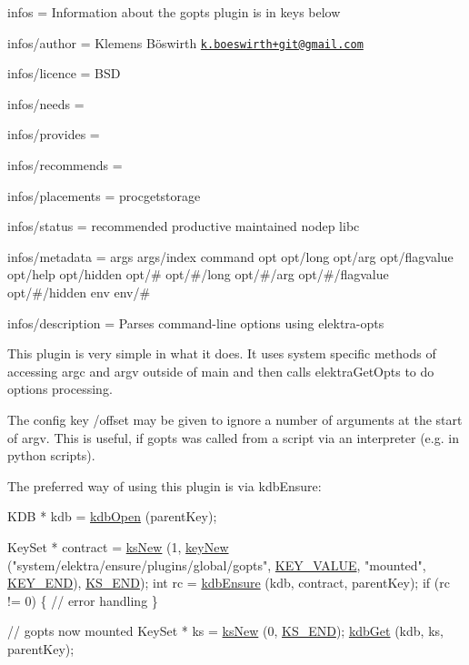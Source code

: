 
\begin{DoxyItemize}
\item infos = Information about the gopts plugin is in keys below
\item infos/author = Klemens Böswirth \href{mailto:k.boeswirth+git@gmail.com}{\tt k.\+boeswirth+git@gmail.\+com}
\item infos/licence = B\+SD
\item infos/needs =
\item infos/provides =
\item infos/recommends =
\item infos/placements = procgetstorage
\item infos/status = recommended productive maintained nodep libc
\item infos/metadata = args args/index command opt opt/long opt/arg opt/flagvalue opt/help opt/hidden opt/\# opt/\#/long opt/\#/arg opt/\#/flagvalue opt/\#/hidden env env/\#
\item infos/description = Parses command-\/line options using elektra-\/opts
\end{DoxyItemize}

This plugin is very simple in what it does. It uses system specific methods of accessing {\ttfamily argc} and {\ttfamily argv} outside of {\ttfamily main} and then calls {\ttfamily elektra\+Get\+Opts} to do options processing.

The config key {\ttfamily /offset} may be given to ignore a number of arguments at the start of {\ttfamily argv}. This is useful, if {\ttfamily gopts} was called from a script via an interpreter (e.\+g. in python scripts).

The preferred way of using this plugin is via {\ttfamily kdb\+Ensure}\+:


\begin{DoxyCode}
KDB * kdb = \hyperlink{group__kdb_ga6808defe5870f328dd17910aacbdc6ca}{kdbOpen} (parentKey);

KeySet * contract = \hyperlink{group__keyset_ga671e1aaee3ae9dc13b4834a4ddbd2c3c}{ksNew} (1, \hyperlink{group__key_gad23c65b44bf48d773759e1f9a4d43b89}{keyNew} (\textcolor{stringliteral}{"system/elektra/ensure/plugins/global/gopts"}, 
      \hyperlink{group__key_gga9b703ca49f48b482def322b77d3e6bc8ac66e4a49d09212b79f5754ca6db5bd2e}{KEY\_VALUE}, \textcolor{stringliteral}{"mounted"}, \hyperlink{group__key_gga9b703ca49f48b482def322b77d3e6bc8aa8adb6fcb92dec58fb19410eacfdd403}{KEY\_END}), \hyperlink{group__keyset_ga7a28fce3773b2c873c94ac80b8b4cd54}{KS\_END});
\textcolor{keywordtype}{int} rc = \hyperlink{group__kdb_ga0955373877575fa21275891518f8ab31}{kdbEnsure} (kdb, contract, parentKey);
\textcolor{keywordflow}{if} (rc != 0)
\{
        \textcolor{comment}{// error handling}
\}

\textcolor{comment}{// gopts now mounted}
KeySet * ks = \hyperlink{group__keyset_ga671e1aaee3ae9dc13b4834a4ddbd2c3c}{ksNew} (0, \hyperlink{group__keyset_ga7a28fce3773b2c873c94ac80b8b4cd54}{KS\_END});
\hyperlink{group__kdb_ga28e385fd9cb7ccfe0b2f1ed2f62453a1}{kdbGet} (kdb, ks, parentKey);
\end{DoxyCode}


